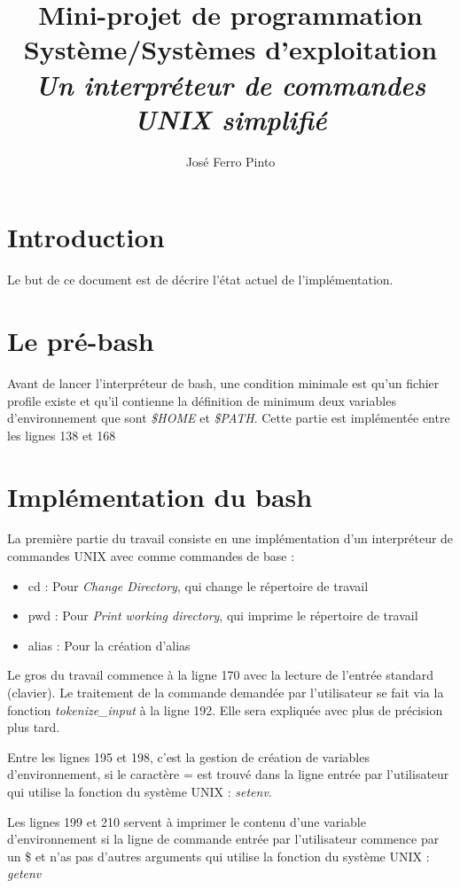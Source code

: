 \documentclass[a4paper,10pt]{article}
\title{Mini-projet de programmation Système/Systèmes d’exploitation\\
\large\emph{Un interpréteur de commandes UNIX simplifié}}
\author{José Ferro Pinto}
\begin{document}
\maketitle

\section{Introduction}
Le but de ce document est de décrire l'état actuel de l'implémentation.

\section{Le pré-bash}
Avant de lancer l'interpréteur de bash, une condition minimale est qu'un fichier profile existe et qu'il contienne la définition de minimum deux variables d'environnement que sont \emph{\$HOME} et \emph{\$PATH}.
Cette partie est implémentée entre les lignes 138 et 168

\section{Implémentation du bash}

La première partie du travail consiste en une implémentation d'un interpréteur de commandes UNIX avec comme commandes de base :
\begin{itemize}
	\item cd : Pour \emph{Change Directory}, qui change le répertoire de travail
	\item pwd : Pour \emph{Print working directory}, qui imprime le répertoire de travail
	\item alias : Pour la création d'alias
\end{itemize}

Le gros du travail commence à la ligne 170 avec la lecture de l'entrée standard (clavier). Le traitement de la commande demandée par l'utilisateur se fait via la fonction \emph{tokenize\_input} à la ligne 192. Elle sera expliquée avec plus de précision plus tard.

Entre les lignes 195 et 198, c'est la gestion de création de variables d'environnement, si le caractère = est trouvé dans la ligne entrée par l'utilisateur qui utilise la fonction du système UNIX : \emph{setenv}.

Les lignes 199 et 210 servent à imprimer le contenu d'une variable d'environnement si la ligne de commande entrée par l'utilisateur commence par un \$ et n'as pas d'autres arguments qui utilise la fonction du système UNIX : \emph{getenv}
\end{document}
